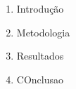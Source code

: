 \documentclass[preview]{standalone}
\begin{document}
\begin{center}
\begin{enumerate}
                \item Introdução
                \item Metodologia
                \item Resultados
                \item COnclusao
            \end{enumerate}
\end{center}
\end{document}
